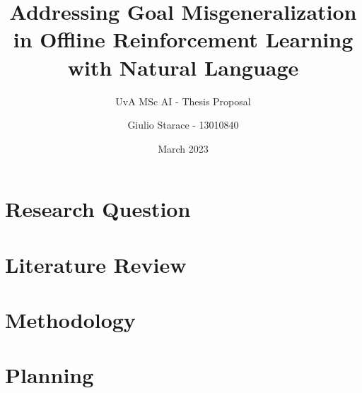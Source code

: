 \documentclass[12pt, headings=standardclasses]{scrartcl}
\title{Addressing Goal Misgeneralization in Offline Reinforcement Learning with Natural Language}
\subtitle{UvA MSc AI - Thesis Proposal}
\begin{document}
\author{Giulio Starace - 13010840}
\date{March 2023}
\maketitle
\section{Research Question}

\section{Literature Review}

\section{Methodology}
\section{Planning}



\end{document}
